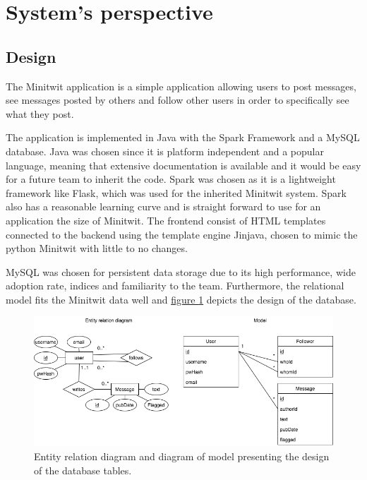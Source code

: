 \section{System's perspective} \label{section:System perspective}
\subsection{Design}
The Minitwit application is a simple application allowing users to post messages, see messages posted by others and follow other users in order to specifically see what they post.

The application is implemented in Java with the Spark Framework and a MySQL database. Java was chosen since it is platform independent and a popular language, meaning that extensive documentation is available and it would be easy for a future team to inherit the code. Spark was chosen as it is a lightweight framework like Flask, which was used for the inherited Minitwit system. Spark also has a reasonable learning curve and is straight forward to use for an application the size of Minitwit. The frontend consist of HTML templates connected to the backend using the template engine Jinjava, chosen to mimic the python Minitwit with little to no changes. 

MySQL was chosen for persistent data storage due to its high performance, wide adoption rate, indices and familiarity to the team. Furthermore, the relational model fits the Minitwit data well and \hyperref[fig:classDiagramModel]{figure \ref{fig:databaseDiagram}} depicts the design of the database.
\begin{figure}[H]
    \centering
    \includegraphics[width=1\textwidth]{report/images/Diagrams-DB.png}
    \caption{Entity relation diagram and diagram of model presenting the design of the database tables.}
    \label{fig:databaseDiagram}
\end{figure} 
\vspace{3mm}


